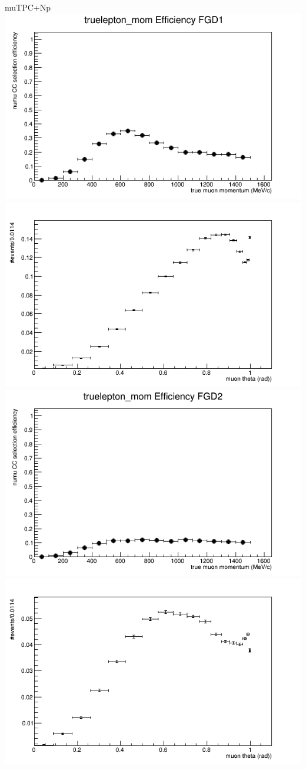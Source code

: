 \documentclass{beamer}
\begin{document}
\begin{frame}{muTPC+Np}
\center
\includegraphics[width=.45\textwidth]{images/Eff_truelepton_mom_topology_muTPC+Np_accum_level[][0][97]_data_mc.png}
\includegraphics[width=.45\textwidth]{images/Eff_truelepton_costheta_topology_muTPC+Np_accum_level[][0][97]_data_mc.png}
\includegraphics[width=.45\textwidth]{images/Eff_truelepton_mom_fgd2topology_muTPC+Np_accum_level[][1][97]_data_mc.png}
\includegraphics[width=.45\textwidth]{images/Eff_truelepton_costheta_fgd2topology_muTPC+Np_accum_level[][1][97]_data_mc.png}
\end{frame}
\end{document}
